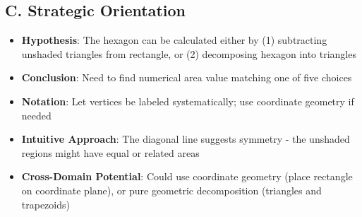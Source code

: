 \documentclass[11pt]{article}
\begin{document}
\begin{problemconfigbox}
\subsection*{C. Strategic Orientation}
\begin{itemize}[leftmargin=*]
    \item \textbf{Hypothesis}: The hexagon can be calculated either by (1) subtracting unshaded triangles from rectangle, or (2) decomposing hexagon into triangles
    \item \textbf{Conclusion}: Need to find numerical area value matching one of five choices
    \item \textbf{Notation}: Let vertices be labeled systematically; use coordinate geometry if needed
    \item \textbf{Intuitive Approach}: The diagonal line suggests symmetry - the unshaded regions might have equal or related areas
    \item \textbf{Cross-Domain Potential}: Could use coordinate geometry (place rectangle on coordinate plane), or pure geometric decomposition (triangles and trapezoids)
\end{itemize}
\end{problemconfigbox}
\end{document}
